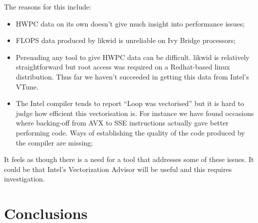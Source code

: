 \documentclass[12pt]{article}
\begin{document}
The reasons for this include:
\begin{itemize}
\item HWPC data on its own doesn't give much insight into performance issues;
\item FLOPS data produced by likwid is unreliable on Ivy Bridge processors;
\item Persuading any tool to give HWPC data can be difficult. likwid
  is relatively straightforward but root access was required on a
  Redhat-based linux distribution. Thus far we haven't succeeded in
  getting this data from Intel's VTune.
\item The Intel compiler tends to report ``Loop was vectorised'' but
  it is hard to judge how efficient this vectorisation is. For
  instance we have found occasions where backing-off from AVX to SSE
  instructions actually gave better performing code. Ways of
  establishing the quality of the code produced by the compiler are
  missing;
\end{itemize}

It feels as though there is a need for a tool that addresses some of
these issues. It could be that Intel's Vectorization Advisor will be
useful and this requires investigation.


\section{Conclusions}



\end{document}
